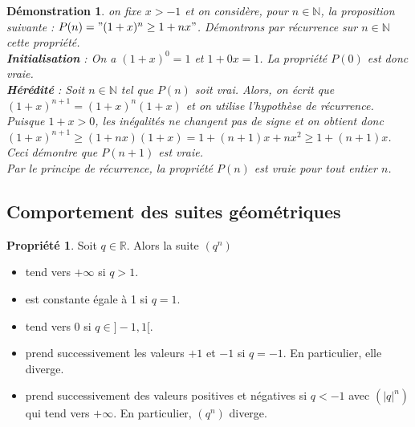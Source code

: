 \documentclass[a4paper,12pt,final]{article}
\newtheorem{Proof}{Démonstration}[section]
\theoremstyle{theorem}
\theoremstyle{definition}
\newtheorem{Propriete}{Propriété}[section]
\theoremstyle{definition}
\theoremstyle{definition}
\begin{document}
\begin{Proof}
	on fixe $x>−1$ et on considère, pour $n \in \mathbb{N}$, la proposition suivante : $P(n)="(1+x)^{n} \geq 1+nx"$. Démontrons par récurrence sur $n \in \mathbb{N}$ cette propriété. \\
	
	\textbf{Initialisation} : On a $(1+x)^{0}=1$ et $1+0x=1$. La propriété $P(0)$ est donc vraie. \\
	
	\textbf{Hérédité} : Soit $n \in \mathbb{N}$ tel que $P(n)$ soit vrai. Alors, on écrit que $(1+x)^{n+1}=(1+x)^{n}(1+x)$ et on utilise l'hypothèse de récurrence. Puisque $1+x>0$, les inégalités ne changent pas de signe et on obtient donc $(1+x)^{n+1} \geq (1+nx)(1+x)=1+(n+1)x+nx^{2} \geq 1+(n+1)x$. Ceci démontre que $P(n+1)$ est vraie. \\
	
	Par le principe de récurrence, la propriété $P(n)$ est vraie pour tout entier $n$.
\end{Proof}

	\subsection{Comportement des suites géométriques}
	
\begin{Propriete}
	Soit $q \in \mathbb{R}$. Alors la suite $(q^{n})$
	\begin{itemize}
		\item tend vers $+\infty$ si $q>1$.
		\item est constante égale à 1 si $q=1$.
		\item tend vers 0 si $q \in ]−1,1[$.
		\item prend successivement les valeurs $+1$ et $−1$ si $q=−1$. En particulier, elle diverge.
		\item prend successivement des valeurs positives et négatives si $q<−1$ avec $(|q|^{n})$ qui tend vers $+\infty$. En particulier, $(q^{n})$ diverge. 
	\end{itemize}

\end{Propriete}
\end{document}
